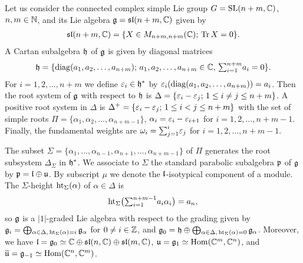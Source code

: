 Let us consider the connected complex simple Lie group $G=\mathrm{SL}(n+m,\mathbb{C})$, $n,m \in \mathbb{N}$, and its Lie algebra $\mathfrak{g}=\mathfrak{sl}(n+m,\mathbb{C})$ given by
\begin{align}
  \mathfrak{sl}(n+m,\mathbb{C})=\{X \in M_{n+m,n+m}(\mathbb{C});\, \operatorname{\mathrm{Tr}} X =0\}.
\end{align}
A Cartan subalgebra $\mathfrak{h}$ of $\mathfrak{g}$ is given by diagonal matrices
\begin{align}
  \mathfrak{h} = \{\mathop {\rm diag} \nolimits(a_1,a_2,\dots,a_{n+m});\, a_1,a_2,\dots,a_{n+m} \in \mathbb{C},\, {\textstyle \sum_{i=1}^{n+m}} a_i=0\}.
\end{align}
For $i=1,2,\dots,n+m$ we define $\varepsilon_i \in \mathfrak{h}^*$ by $\varepsilon_i(\mathop {\rm diag} \nolimits(a_1,a_2,\dots,a_{n+m}))=a_i$. Then the root system of $\mathfrak{g}$ with respect to $\mathfrak{h}$ is $\Delta=\{\varepsilon_i-\varepsilon_j;\, 1\leq i \neq j \leq n+m\}$. A positive root system in $\Delta$ is $\Delta^+=\{\varepsilon_i - \varepsilon_j;\, 1 \leq i < j \leq n+m\}$ with the set of simple roots $\Pi=\{\alpha_1,\alpha_2,\dots,\alpha_{n+m-1}\}$, $\alpha_i= \varepsilon_i - \varepsilon_{i+1}$ for $i=1,2,\dots,n+m-1$. Finally, the fundamental weights are $\omega_i = \smash{\sum_{j=1}^i} \varepsilon_j$ for $i=1,2,\dots,n+m-1$.

 The subset $\Sigma=\{\alpha_1,\dots,\alpha_{n-1},\alpha_{n+1},\dots,\alpha_{n+m-1}\}$ of $\Pi$ generates the root subsystem $\Delta_\Sigma$ in $\mathfrak{h}^*$. We associate to $\Sigma$ the standard parabolic subalgebra $\mathfrak{p}$ of $\mathfrak{g}$ by $\mathfrak{p}= \mathfrak{l} \oplus \mathfrak{u}$. By subscript $\mu$ we denote the $\mathfrak{l}$-isotypical component of a module. The $\Sigma$-height $\mathop {\rm ht} \nolimits_\Sigma(\alpha)$ of $\alpha \in \Delta$ is
\begin{align}
  \mathop {\rm ht} \nolimits_\Sigma\!\big({\textstyle \sum_{i=1}^{n+m-1}} a_i \alpha_i\big) = a_n,
\end{align}
so $\mathfrak{g}$ is a $|1|$-graded Lie algebra with respect to the grading given by $\mathfrak{g}_i = \smash{\bigoplus}_{\alpha \in \Delta,\, \mathop {\rm ht} \nolimits_\Sigma(\alpha)=i}\, \mathfrak{g}_\alpha$ for $0 \neq i \in \mathbb{Z}$, and $\mathfrak{g}_0= \mathfrak{h} \oplus \smash{\bigoplus}_{\alpha \in \Delta,\, \mathop {\rm ht} \nolimits_\Sigma(\alpha)=0}\, \mathfrak{g}_\alpha$. Moreover, we have $\mathfrak{l}= \mathfrak{g}_0 \simeq \mathbb{C} \oplus \mathfrak{sl}(n,\mathbb{C}) \oplus \mathfrak{sl}(m,\mathbb{C})$, $\mathfrak{u}=\mathfrak{g}_1 \simeq \mathrm{Hom} (\mathbb{C}^m,\mathbb{C}^n)$, and $\overline{\mathfrak{u}}=\mathfrak{g}_{-1} \simeq \mathrm{Hom} (\mathbb{C}^n,\mathbb{C}^m)$.

